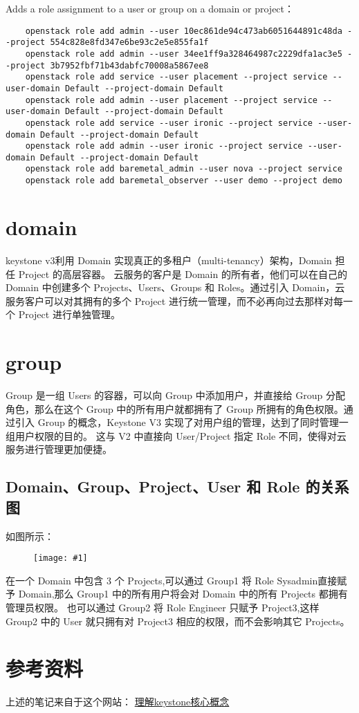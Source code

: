 \documentclass[a4paper,left=1.5cm,right=1.5cm,11pt]{article}
\newcommand{\fic}[1]{\begin{figure}[H]
		\center
		\texttt{[image: \#1]}
	\end{figure}}
\begin{document}
	Adds a role assignment to a user or group on a domain or project：
	\begin{lstlisting}
	openstack role add admin --user 10ec861de94c473ab6051644891c48da --project 554c828e8fd347e6be93c2e5e855fa1f
	openstack role add admin --user 34ee1ff9a328464987c2229dfa1ac3e5 --project 3b7952fbf71b43dabfc70008a5867ee8
	openstack role add service --user placement --project service --user-domain Default --project-domain Default
	openstack role add admin --user placement --project service --user-domain Default --project-domain Default
	openstack role add service --user ironic --project service --user-domain Default --project-domain Default
	openstack role add admin --user ironic --project service --user-domain Default --project-domain Default
	openstack role add baremetal_admin --user nova --project service
	openstack role add baremetal_observer --user demo --project demo
	\end{lstlisting}

\section{domain}
	keystone v3利用 Domain 实现真正的多租户（multi-tenancy）架构，Domain 担任 Project 的高层容器。
	云服务的客户是 Domain 的所有者，他们可以在自己的 Domain 中创建多个 Projects、Users、Groups 和 Roles。通过引入 Domain，云服务客户可以对其拥有的多个 Project 进行统一管理，而不必再向过去那样对每一个 Project 进行单独管理。\par

\section{group}
	Group 是一组 Users 的容器，可以向 Group 中添加用户，并直接给 Group 分配角色，那么在这个 Group 中的所有用户就都拥有了 Group 所拥有的角色权限。通过引入 Group 的概念，Keystone V3 实现了对用户组的管理，达到了同时管理一组用户权限的目的。
	这与 V2 中直接向 User/Project 指定 Role 不同，使得对云服务进行管理更加便捷。

\subsection{Domain、Group、Project、User 和 Role 的关系图}
	如图所示：
	\fic{5.png}

	在一个 Domain 中包含 3 个 Projects,可以通过 Group1 将 Role Sysadmin直接赋予 Domain,那么 Group1 中的所有用户将会对 Domain 中的所有 Projects 都拥有管理员权限。
	也可以通过 Group2 将 Role Engineer 只赋予 Project3,这样 Group2 中的 User 就只拥有对 Project3 相应的权限，而不会影响其它 Projects。

\section{参考资料}
	上述的笔记来自于这个网站：
	\href{https://www.ibm.com/developerworks/community/blogs/132cfa78-44b0-4376-85d0-d3096cd30d3f/entry/%E7%90%86%E8%A7%A3_Keystone_%E6%A0%B8%E5%BF%83%E6%A6%82%E5%BF%B5_%E6%AF%8F%E5%A4%A95%E5%88%86%E9%92%9F%E7%8E%A9%E8%BD%AC_OpenStack_18?lang=en}{理解keystone核心概念}
	
\end{document}

